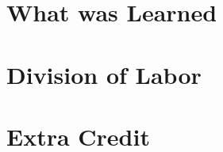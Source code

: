 \documentclass[pdftex, 11pt]{article}
\begin{document}
\section{What was Learned}

\section{Division of Labor}

\section{Extra Credit}
\end{document}

